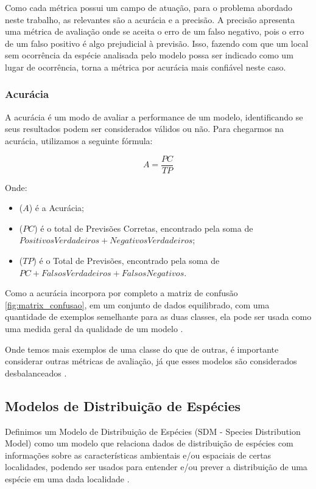 \documentclass[
    12pt,               %
    openright,          %
    oneside,            %
    a4paper,            %
    english,            %
    brazil              %
    ]{abntex2}
\begin{document}
Como cada métrica possui um campo de atuação, para o problema abordado neste trabalho, as relevantes são a acurácia e a precisão.
A precisão apresenta uma métrica de avaliação onde se aceita o erro de um falso negativo, pois o erro de um falso positivo
é algo prejudicial à previsão. Isso, fazendo com que um local sem ocorrência da espécie analisada pelo modelo possa ser indicado como 
um lugar de ocorrência, torna a métrica por acurácia mais confiável neste caso.

\subsubsection{Acurácia}

A acurácia é um modo de avaliar a performance de um modelo, identificando se seus resultados podem
ser considerados válidos ou não. Para chegarmos na acurácia, utilizamos a seguinte fórmula:

\begin{equation}
    \label{eq:acuracia}
    A = \frac{PC}{TP}
\end{equation}

Onde:
\begin{itemize}
    \item ($A$) é a Acurácia;
    \item ($PC$) é o total de Previsões Corretas, encontrado pela soma de $Positivos Verdadeiros + Negativos Verdadeiros$;
    \item ($TP$) é o Total de Previsões, encontrado pela soma de $PC + Falsos Verdadeiros + Falsos Negativos$.
\end{itemize}

Como a acurácia incorpora por completo a matriz de confusão \ref{fig:matrix_confusao}, em um conjunto de dados equilibrado, 
com uma quantidade de exemplos semelhante para as duas classes, ela pode ser usada como uma medida geral da qualidade 
de um modelo \cite{acuracia_matriz}.

Onde temos mais exemplos de uma classe do que de outras, é importante considerar outras métricas de avaliação, já que esses
modelos são considerados desbalanceados \cite{acuracia}.

\subsection{Modelos de Distribuição de Espécies}

Definimos um Modelo de Distribuição de Espécies (SDM - Species Distribution Model) como um modelo que relaciona dados de 
distribuição de espécies com informações sobre as características ambientais e/ou espaciais de certas localidades, podendo 
ser usados para entender e/ou prever a distribuição de uma espécie em uma dada localidade \cite{speciesDistributionModels}.
\end{document}
